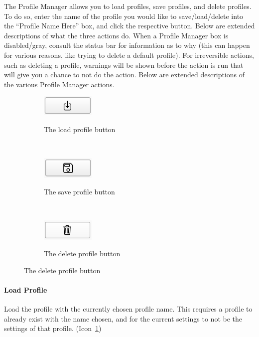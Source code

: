 \documentclass[titlepage]{article}
\begin{document}
The Profile Manager allows you to load profiles, save profiles, and delete profiles. To do so, enter the name of the profile you would like to save/load/delete into the ``Profile Name Here'' box, and click the respective button. Below are extended descriptions of what the three actions do. When a Profile Manager box is disabled/gray, consult the status bar for information as to why (this can happen for various reasons, like trying to delete a default profile). For irreversible actions, such as deleting a profile, warnings will be shown before the action is run that will give you a chance to not do the action. Below are extended descriptions of the various Profile Manager actions.

\begin{figure}
	\caption{Various Profile Actions}
	
	\centering
	\begin{subfigure}{.3\textwidth}
		\centering
		\caption{The load profile button}
		\includegraphics[width=1in]{load-profile-button.png}
		\label{fig:load-profile-button}
	\end{subfigure}%
	~
	\begin{subfigure}{.3\textwidth}
		\centering
		\caption{The save profile button}
		\includegraphics[width=1in]{save-profile-button.png}
		\label{fig:save-profile-button}
	\end{subfigure}%
	~
	\begin{subfigure}{.3\textwidth}
		\centering
		\caption{The delete profile button}
		\includegraphics[width=1in]{delete-profile-button.png}
		\label{fig:delete-profile-button}
	\end{subfigure}
\end{figure}

\paragraph{Load Profile}
Load the profile with the currently chosen profile name. This requires a profile to already exist with the name chosen, and for the current settings to not be the settings of that profile. (Icon~\ref{fig:load-profile-button})
\end{document}
